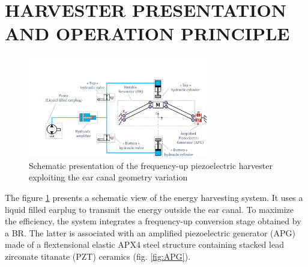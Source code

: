 \documentclass[3p,twocolumn,preprint]{elsarticle}
\begin{document}
\section{HARVESTER PRESENTATION AND OPERATION \mbox{PRINCIPLE}}
\label{sec:HARVESTER PRESENTATION AND OPERATION PRINCIPLE}
\begin{figure}[!htbp]
	\centering
	\captionsetup{justification=centering}
	\includegraphics[trim={3.2cm 0cm 0cm 4.3cm},clip, width=0.7\textwidth]{figures/system_presentation.pdf}
	\caption{Schematic presentation of the frequency-up piezoelectric harvester exploiting the ear canal geometry variation} 
	\label{fig:system_presentation}
\end{figure}
The figure \ref{fig:system_presentation} presents a schematic view of the energy harvesting system. It uses a liquid filled earplug to transmit the energy outside the ear canal. To maximize the efficiency, the system integrates a frequency-up conversion stage obtained by a BR. The latter is associated with an amplified piezoelectric generator (APG) \cite{CEDRATTECHNOLOGIES2022} made of a flextensional elastic APX4 steel \cite{AUBERT&DUVAL2022} structure containing stacked lead zirconate titanate (PZT) ceramics (fig. \ref{fig:APG}).
\end{document}
